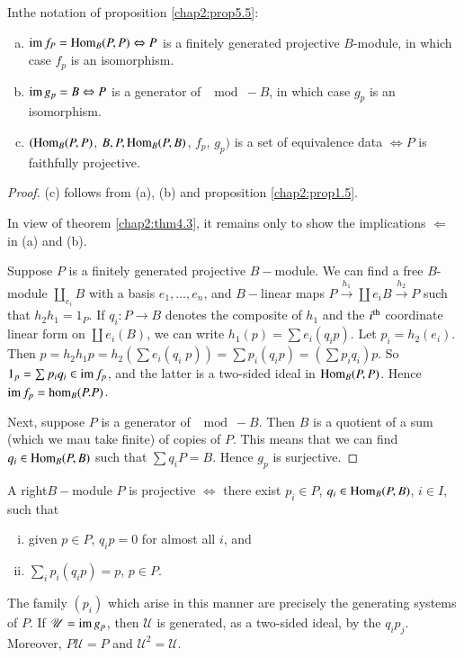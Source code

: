 \begin{prop}\label{chap2:prop5.6}%
In\pageoriginale the notation of proposition \ref{chap2:prop5.5}: 
\begin{enumerate}[(a)]
\item $ \operatorname{im} f_P = \operatorname{Hom}_B (P, P) \Leftrightarrow P$ is a finitely
  generated projective $B$-modu\-le, in which case $f_p$ is an
  isomorphism.  

\item $\operatorname{im} g_p = B \Leftrightarrow P$ is a generator of $\mod -B $, in
  which case $g_p$ is an isomorphism. 

\item $(\operatorname{Hom}_B (P, P)$, $B, P, \operatorname{Hom}_B (P, B)$, $f_p$, $g_p)$ is a set
  of equivalence data $\Leftrightarrow P$ is faithfully projective. 
\end{enumerate} 
\end{prop}

\begin{proof}
(c) follows from (a), (b) and proposition \ref{chap2:prop1.5}.

In view of theorem \ref{chap2:thm4.3}, it remains only to show the implications
$\Leftarrow$ in (a) and (b).  

Suppose $P$ is a finitely generated projective $B-$module. We can find
a free $B$-module $\coprod_{e_i} B$ with a basis $e_1, \ldots, e_n$,
and $B-$linear maps $P \xrightarrow{h_1} \coprod e_i B
\xrightarrow{h_2}P$ such that $h_2 h_1 = 1_P$. If $q_i : P \to B$
denotes the composite of $h_1$ and the $i^{\rm th}$ coordinate linear
form on $\coprod e_i (B)$, we can write $h_1 (p) = \sum e_i (q_i
p)$. Let $p_i = h_2 (e_i)$. Then $p = h_2h_1 p = h_2 (\sum e_i (q_i
\; p)) = \sum 
p_i (q_i p) = (\sum p_i q_i ) p$. So $1_p = \sum p_i q_i \in \operatorname{im} f_p$,
and the latter is a two-sided ideal in $\operatorname{Hom}_B (P, P)$. Hence  $\operatorname{im} f_p
= \hom_B (P. P)$.  

Next, suppose $P$ is a generator of $\mod - B$. Then $B$ is a quotient
of a sum (which we mau take finite) of copies of $P$. This means that
we can find $q_i \in \operatorname{Hom}_B (P, B)$ such that $\sum q_i P = B$. Hence
$g_p$ is surjective. 
\end{proof}

\setcounter{lemma}{6}
\begin{lemma}\label{chap2:lem5.7}%
A right\pageoriginale $B-$module $P$ is projective $\Leftrightarrow$
there exist 
$p_i \in P$, $q_i \in \operatorname{Hom}_B(P, B)$, $i \in I$, such that 
\begin{enumerate}[(i)]
\item given $p \in P$, $q_i p = 0$ for almost all $i$, and 

\item $\sum_i p_i (q_i p) = p$, $p \in P$.
\end{enumerate}
 
The family $(p_i)$ which arise in this manner are precisely the
generating systems of $P$. If $\mathscr{U} = \operatorname{im} g_p$, then
$\mathscr{U}$ is generated, as a two-sided ideal, by the $q_i
p_j$. Moreover, $ P \mathscr{U} = P$ and $\mathscr{U}^2 =
\mathscr{U}$. 
\end{lemma}

